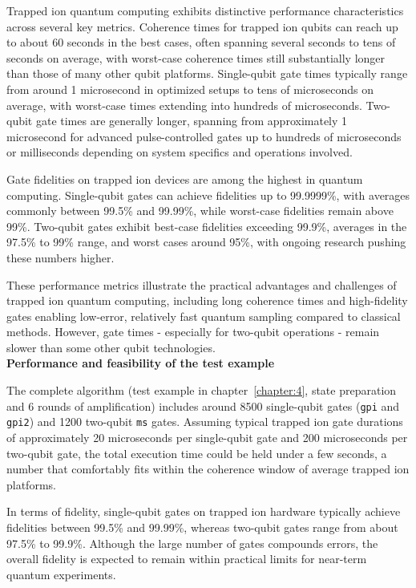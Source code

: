 \documentclass[encoding=utf8,british]{tumphthesis}
\begin{document}
Trapped ion quantum computing exhibits distinctive performance characteristics across several key metrics. Coherence times for trapped ion qubits can reach up to about 
60 seconds in the best cases, often spanning several seconds to tens of seconds on average, with worst-case coherence times still substantially longer than those of many 
other qubit platforms. Single-qubit gate times typically range from around 1 microsecond in optimized setups to tens of microseconds on average, with worst-case times 
extending into hundreds of microseconds. Two-qubit gate times are generally longer, spanning from approximately 1 microsecond for advanced pulse-controlled gates up to 
hundreds of microseconds or milliseconds depending on system specifics and operations involved.

Gate fidelities on trapped ion devices are among the highest in quantum computing. Single-qubit gates can achieve fidelities up to 99.9999\%, with averages commonly 
between 99.5\% and 99.99\%, while worst-case fidelities remain above 99\%. Two-qubit gates exhibit best-case fidelities exceeding 99.9\%, averages in the 97.5\% to 99\% 
range, and worst cases around 95\%, with ongoing research pushing these numbers higher.

These performance metrics illustrate the practical advantages and challenges of trapped ion quantum computing, including long coherence times and high-fidelity gates 
enabling low-error, relatively fast quantum sampling compared to classical methods. However, gate times - especially for two-qubit operations - remain slower than some 
other qubit technologies.
\\

\textbf{Performance and feasibility of the test example}
            
The complete algorithm (test example in chapter~\ref{chapter:4}, state preparation and 6 rounds of amplification) includes around 8500 single-qubit gates (\texttt{gpi} and \texttt{gpi2}) and 1200 two-qubit \texttt{ms} gates. Assuming typical trapped ion gate durations of 
approximately 20 microseconds per single-qubit gate and 200 microseconds per two-qubit gate, the total execution time could be held under a few seconds,
a number that comfortably fits within the coherence window of average trapped ion platforms. 

In terms of fidelity, single-qubit gates on trapped ion hardware typically achieve fidelities between 99.5\% and 99.99\%, whereas two-qubit gates range from about 97.5\% to 99.9\%. 
Although the large number of gates compounds errors, the overall fidelity is expected to remain within practical limits for near-term quantum experiments.
\end{document}
